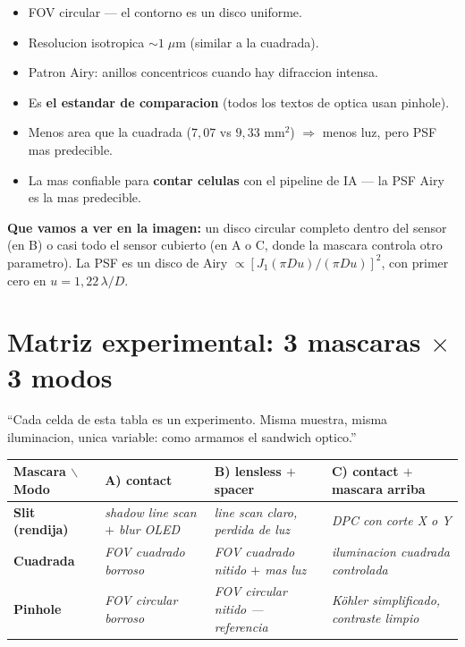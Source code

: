 \documentclass[11pt,a4paper,oneside]{report}
\begin{document}
\begin{hipotesis}
\begin{itemize}[leftmargin=1.5em]
  \item FOV circular --- el contorno es un disco uniforme.
  \item Resolucion isotropica $\sim 1\;\mu$m (similar a la cuadrada).
  \item Patron Airy: anillos concentricos cuando hay difraccion intensa.
  \item Es \textbf{el estandar de comparacion} (todos los textos de optica usan pinhole).
  \item Menos area que la cuadrada ($7{,}07$ vs $9{,}33$ mm$^2$) $\Rightarrow$ menos luz, pero PSF mas predecible.
  \item La mas confiable para \textbf{contar celulas} con el pipeline de IA
        --- la PSF Airy es la mas predecible.
\end{itemize}
\end{hipotesis}

\textbf{Que vamos a ver en la imagen:} un disco circular completo dentro del sensor (en B)
o casi todo el sensor cubierto (en A o C, donde la mascara controla otro parametro).
La PSF es un disco de Airy $\propto [J_1(\pi D u)/(\pi D u)]^2$, con primer cero en
$u = 1{,}22\,\lambda/D$.

\chapter{Matriz experimental: 3 mascaras $\times$ 3 modos}

\begin{decir}
``Cada celda de esta tabla es un experimento. Misma muestra, misma iluminacion,
unica variable: como armamos el sandwich optico.''
\end{decir}

\begin{center}
\renewcommand{\arraystretch}{1.4}
\begin{tabular}{p{2.6cm}p{3.5cm}p{3.5cm}p{4cm}}
\toprule
\textbf{Mascara $\backslash$ Modo} & \textbf{A) contact} & \textbf{B) lensless $+$ spacer} & \textbf{C) contact $+$ mascara arriba} \\
\midrule
\textbf{Slit (rendija)} &
\textit{shadow line scan $+$ blur OLED} &
\textit{line scan claro, perdida de luz} &
\textit{DPC con corte X o Y} \\
\textbf{Cuadrada} &
\textit{FOV cuadrado borroso} &
\textit{FOV cuadrado nitido $+$ mas luz} &
\textit{iluminacion cuadrada controlada} \\
\textbf{Pinhole} &
\textit{FOV circular borroso} &
\textit{FOV circular nitido --- referencia} &
\textit{Köhler simplificado, contraste limpio} \\
\bottomrule
\end{tabular}
\end{center}
\end{document}
